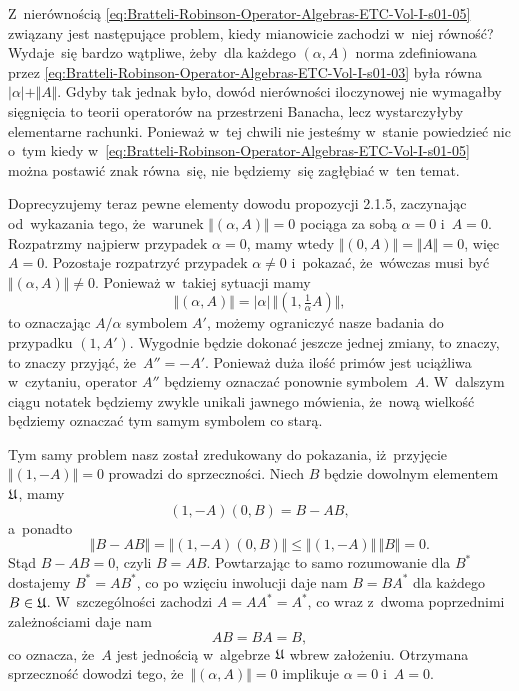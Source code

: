 \documentclass[a4paper,11pt]{article}
\numberwithin{equation}{section}
\begin{document}
Z~nierównością
\eqref{eq:Bratteli-Robinson-Operator-Algebras-ETC-Vol-I-s01-05} związany
jest następujące problem, kiedy mianowicie zachodzi w~niej równość?
Wydaje~się bardzo wątpliwe, żeby~dla każdego $( \alpha, A )$ norma zdefiniowana
przez \eqref{eq:Bratteli-Robinson-Operator-Algebras-ETC-Vol-I-s01-03} była
równa $| \alpha | + \Vert A \Vert$. Gdyby tak jednak było, dowód nierówności iloczynowej
nie wymagałby sięgnięcia to teorii operatorów na przestrzeni Banacha, lecz
wystarczyłyby elementarne rachunki. Ponieważ w~tej chwili nie jesteśmy
w~stanie powiedzieć nic o~tym kiedy
w~\eqref{eq:Bratteli-Robinson-Operator-Algebras-ETC-Vol-I-s01-05} można
postawić znak równa~się, nie będziemy~się zagłębiać w~ten temat.

Doprecyzujemy teraz pewne elementy dowodu propozycji 2.1.5, zaczynając
od~wykazania tego, że~warunek $\Vert ( \alpha, A ) \Vert = 0$ pociąga za sobą $\alpha = 0$
i~$A = 0$. Rozpatrzmy najpierw przypadek $\alpha = 0$, mamy wtedy
$\Vert ( 0, A ) \Vert = \Vert A \Vert = 0$, więc $A = 0$. Pozostaje rozpatrzyć przypadek
$\alpha \neq 0$ i~pokazać, że~wówczas musi być $\Vert ( \alpha, A ) \Vert \neq 0$. Ponieważ w~takiej
sytuacji mamy
\begin{equation}
  \label{eq:Bratteli-Robinson-Operator-Algebras-ETC-Vol-I-s01-11}
  \Vert ( \alpha, A ) \Vert = | \alpha | \, \Vert ( 1, \tfrac{ 1 }{ \alpha } A ) \Vert,
\end{equation}
to oznaczając $A / \alpha$ symbolem $A'$, możemy ograniczyć nasze badania
do przypadku $( 1, A' )$. Wygodnie będzie dokonać jeszcze jednej zmiany, to
znaczy, to znaczy przyjąć, że~$A'' = -A'$. Ponieważ duża ilość primów jest
uciążliwa w~czytaniu, operator $A''$ będziemy oznaczać ponownie
symbolem~$A$. W~dalszym ciągu notatek będziemy zwykle unikali jawnego
mówienia, że~nową wielkość będziemy oznaczać tym samym symbolem co starą.

Tym samy problem nasz został zredukowany do pokazania, iż~przyjęcie
$\Vert ( 1, -A ) \Vert = 0$ prowadzi do sprzeczności. Niech $B$ będzie dowolnym
elementem $\mathfrak{U}$, mamy
\begin{equation}
  \label{eq:Bratteli-Robinson-Operator-Algebras-ETC-Vol-I-s01-12}
  ( 1, -A ) ( 0, B ) = B - AB,
\end{equation}
a~ponadto
\begin{equation}
  \label{eq:Bratteli-Robinson-Operator-Algebras-ETC-Vol-I-s01-13}
  \Vert B - A B \Vert =
  \Vert ( 1, -A ) ( 0, B ) \Vert \leq
  \Vert ( 1, -A ) \Vert \, \Vert B \Vert = 0.
\end{equation}
Stąd $B - A B = 0$, czyli $B = A B$. Powtarzając to samo rozumowanie dla
$B^{ * }$ dostajemy $B^{ * } = A B^{ * }$, co po wzięciu inwolucji daje nam
$B = B A^{ * }$ dla każdego $B \in \mathfrak{U}$. W~szczególności zachodzi
$A = A A^{ * } = A^{ * }$, co wraz z~dwoma poprzednimi zależnościami daje nam
\begin{equation}
  \label{eq:Bratteli-Robinson-Operator-Algebras-ETC-Vol-I-s01-14}
  A B = B A = B,
\end{equation}
co oznacza, że~$A$ jest jednością w~algebrze $\mathfrak{U}$ wbrew założeniu.
Otrzymana sprzeczność dowodzi tego, że~$\Vert ( \alpha, A ) \Vert = 0$ implikuje
$\alpha = 0$ i~$A = 0$.
\end{document}
